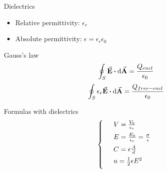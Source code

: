 \documentclass{beamer}
\begin{document}
\begin{frame}{Dielectrics}
    \begin{itemize}
        \item Relative permittivity: $ \epsilon_r $
        \item Absolute permittivity: $ \epsilon = \epsilon_r \epsilon_0$
    \end{itemize}
    \vfill
    \begin{block}{Gauss's law}
        \begin{equation}
            \oint_S \va{E} \vdot \dd{\va{A}} = \frac{Q_{encl}}{\epsilon_0}
        \end{equation}
        \begin{equation}
            \oint_S \epsilon_r \va{E} \vdot \dd{\va{A}} = \frac{Q_{free-encl}}{\epsilon_0}
        \end{equation}
    \end{block}
    \begin{beamerboxesrounded}[shadow=true]{Formulas with dielectrics}
        \begin{equation}
            \left\{
                \begin{array}{ll}
                    \vspace{.5em}
                   & V = \frac{V_0}{\epsilon_r} \\ \vspace{.5em}
                   & E = \frac{E_0}{\epsilon_r} = \frac{\sigma}{\epsilon} \\ \vspace{.5em}
                   & C = \epsilon \frac{A}{d} \\\vspace{.5em}
                   & u = \frac{1}{2} \epsilon E^2
                \end{array}
            \right.
        \end{equation}
    \end{beamerboxesrounded}    
\end{frame}
\end{document}
